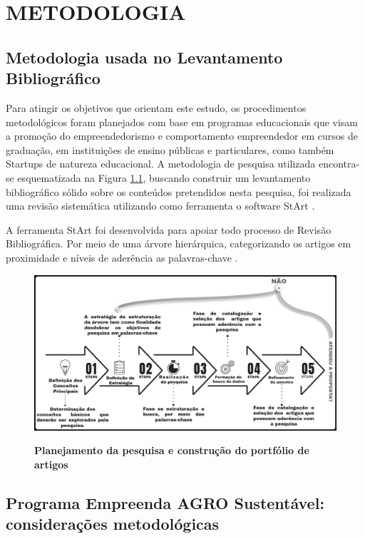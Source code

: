 \chapter{METODOLOGIA}

\section{Metodologia usada no Levantamento Bibliográfico}


Para atingir os objetivos que orientam este estudo, os procedimentos metodológicos foram planejados com base em programas educacionais que visam a promoção do empreendedorismo e comportamento empreendedor em cursos de graduação, em instituições de ensino públicas e particulares, como também Startups de natureza educacional. 
A metodologia de pesquisa utilizada encontra-se esquematizada na Figura \ref{figura_29}, buscando construir um levantamento bibliográfico sólido sobre os conteúdos pretendidos nesta pesquisa, foi realizada uma revisão sistemática utilizando como ferramenta o software StArt \cite{lapes_start_2016}. 

A ferramenta StArt foi desenvolvida para apoiar todo processo de Revisão Bibliográfica. Por meio de uma árvore hierárquica, categorizando os artigos em proximidade e níveis de aderência as palavras-chave \cite{hernandes_avaliacao_2010}. 

\begin{figure}[H]
\centering
\caption{\textbf{Planejamento da pesquisa e construção do portfólio de artigos}}
\includegraphics[scale=0.25]{Imagens/fases_pesquisa_bibliografica.png}
\label{figura_29}
\end{figure}

\section{Programa Empreenda AGRO Sustentável: considerações metodológicas}


